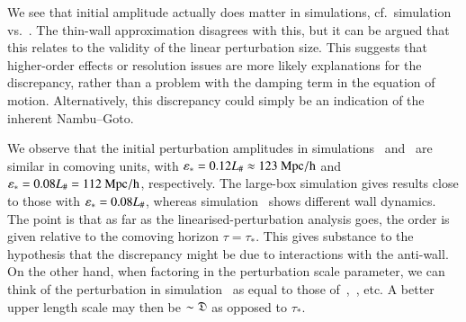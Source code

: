 We see that initial amplitude actually does matter in simulations, cf.~simulation  vs.~. The thin-wall approximation disagrees with this, but it can be argued that this relates to the validity of the linear perturbation size. %
This suggests that higher-order effects or resolution issues are more likely explanations for the discrepancy, rather than a problem with the damping term in the equation of motion. Alternatively, this discrepancy could simply be an indication of the inherent Nambu--Goto. %



We observe that the initial perturbation amplitudes in simulations~ and~ are similar in comoving units, with $\varepsilon_\ast =0.12L_\#\approx 123~\mathrm{Mpc/h}$ and $ \varepsilon_\ast =0.08L_\# = 112~ \mathrm{Mpc/h}$, respectively. The large-box simulation gives results close to those with $\varepsilon_\ast =0.08L_\#$, whereas simulation~ shows different wall dynamics. The point is that as far as the linearised-perturbation analysis goes, the order is given relative to the comoving horizon $\tau=\tau_\ast$. This gives substance to the hypothesis that the discrepancy might be due to interactions with the anti-wall. On the other hand, when factoring in the perturbation scale parameter, we can think of the perturbation in simulation~ as equal to those of~,~, etc. A better upper length scale may then be $\sim \mathfrak{D}$ as opposed to $\tau_\ast$.

    
    


